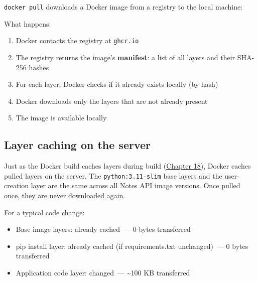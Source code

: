 \texttt{docker\ pull} downloads a Docker image from a registry to the local machine:

\begin{codebox}[short]

\begin{Shaded}
\begin{Highlighting}[]
\end{Highlighting}
\end{Shaded}

\end{codebox}

\noindent{}What happens:

\begin{enumerate}
\def\labelenumi{\arabic{enumi}.}
\tightlist
\item
  Docker contacts the registry at \texttt{ghcr.io}
\item
  The registry returns the image's \textbf{manifest}: a list of all layers and their SHA-256 hashes
\item
  For each layer, Docker checks if it already exists locally (by hash)
\item
  Docker downloads only the layers that are not already present
\item
  The image is available locally
\end{enumerate}

\subsection*{Layer caching on the server}\label{23-code-transfer:layer-caching-on-the-server}

Just as the Docker build caches layers during build (\hyperref[ch:18-containerization]{Chapter 18}), Docker caches pulled layers on the server. The \texttt{python:3.11-slim} base layers and the user-creation layer are the same across all Notes API image versions. Once pulled once, they are never downloaded again.

For a typical code change:

\begin{itemize}
\tightlist
\item
  Base image layers: already cached~--- 0 bytes transferred
\item
  pip install layer: already cached (if requirements.txt unchanged)~--- 0 bytes transferred
\item
  Application code layer: changed~--- \textasciitilde100 KB transferred
\end{itemize}

